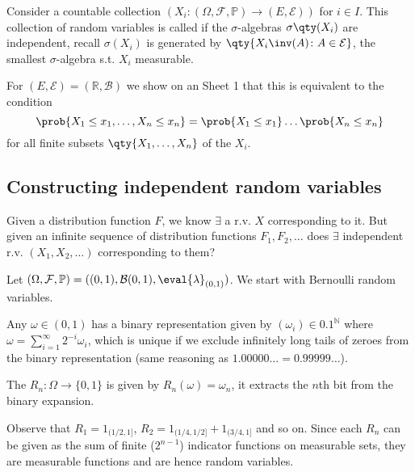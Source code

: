 \begin{definition}[Independent]
	Consider a countable collection $(X_i \colon (\Omega, \mathcal F, \mathbb P) \to (E, \mathcal E))$ for $i \in I$.
	This collection of random variables is called  if the $\sigma$-algebras $\sigma\qty(X_i)$ are independent, recall $\sigma(X_i) $ is generated by $\qty{X_i\inv(A) \colon A \in \mathcal E}$, the smallest $\sigma$-algebra s.t. $X_i$ measurable.
\end{definition}

For $(E, \mathcal E) = (\mathbb R, \mathcal B)$ we show on an Sheet 1 that this is equivalent to the condition
\[ \prob{X_1 \leq x_1, \dots, X_n \leq x_n} = \prob{X_1 \leq x_1} \dots \prob{X_n \leq x_n} \]
for all finite subsets $\qty{X_1, \dots, X_n}$ of the $X_i$.

\subsection{Constructing independent random variables}

\begin{question}
	Given a distribution function $F$, we know $\exists$ a r.v. $X$ corresponding to it.
	But given an infinite sequence of distribution functions $F_1, F_2, \dots$ does $\exists$ independent r.v. $(X_1, X_2, \dots)$ corresponding to them?
\end{question}

Let $(\Omega, \mathcal F, \mathbb P) = ((0,1), \mathcal B(0, 1), \eval{\lambda}_{(0,1)})$.
We start with Bernoulli random variables.

Any $\omega \in (0,1)$ has a binary representation given by $(\omega_i) \in \qty{0,1}^{\mathbb N}$ where $\omega = \sum_{i=1}^{\infty} 2^{-i} \omega_i$, which is unique if we exclude infinitely long tails of zeroes from the binary representation (same reasoning as $1.00000\ldots = 0.99999\dots$).

\begin{definition}
	The  $R_n : \Omega \to \{0, 1\}$ is given by $R_n(\omega) = \omega_n$, it extracts the $n$th bit from the binary expansion.
\end{definition}

Observe that $R_1 = 1_{(1/2, 1]}$, $R_2 = 1_{(1/4, 1/2]} + 1_{(3/4, 1]}$ and so on.
Since each $R_n$ can be given as the sum of finite ($2^{n-1}$) indicator functions on measurable sets, they are measurable functions and are hence random variables.

